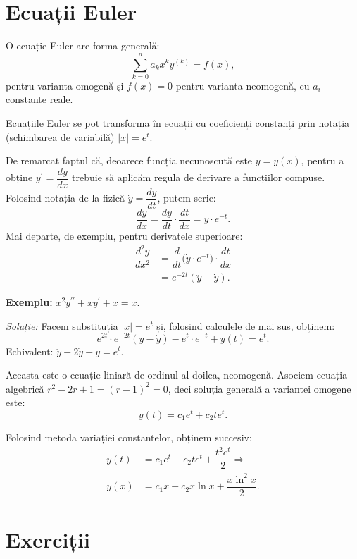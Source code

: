 \section{Ecuații Euler}
O ecuație Euler are forma generală:
\[
  \sum_{k = 0}^n a_k x^k y^{(k)} = f(x),
\]
pentru varianta omogenă și $ f(x) = 0 $ pentru varianta neomogenă, cu $ a_i $
constante reale.

Ecuațiile Euler se pot transforma în ecuații cu coeficienți constanți prin notația
(schimbarea de variabilă) $ |x| = e^t $.

De remarcat faptul că, deoarece funcția necunoscută este $ y = y(x) $, pentru
a obține $ y^{\prime} = \dfrac{dy}{dx} $ trebuie să aplicăm regula de derivare
a funcțiilor compuse. Folosind notația de la fizică $ \dot{y} = \dfrac{dy}{dt} $,
putem scrie:
\[
  \dfrac{dy}{dx} = \dfrac{dy}{dt} \cdot \dfrac{dt}{dx} = \dot{y} \cdot e^{-t}.
\]
Mai departe, de exemplu, pentru derivatele superioare:
\begin{align*}
  \dfrac{d^2 y}{dx^2} &= \dfrac{d}{dt} \Big( \dot{y} \cdot e^{-t} \Big) %
                        \cdot \dfrac{dt}{dx} \\
                      &= e^{-2t} (\ddot{y} - \dot{y}).
\end{align*}

\vspace{1cm}

\textbf{Exemplu:} $ x^2 y^{\prime\prime} + xy^{\prime} + x = x $.

\emph{Soluție:} Facem substituția $ |x| = e^t $ și, folosind calculele
de mai sus, obținem:
\[
  e^{2t} \cdot e^{-2t} (\ddot{y} - \dot{y}) - e^t \cdot e^{-t} + y(t) = e^t.
\]
Echivalent: $ \ddot{y} - 2\dot{y} + y = e^t $.

Aceasta este o ecuație liniară de ordinul al doilea, neomogenă. Asociem ecuația
algebrică $ r^2 - 2r + 1 = (r - 1)^2 = 0 $, deci soluția generală a variantei
omogene este:
\[
  y(t) = c_1 e^t + c_2 te^t.
\]

Folosind metoda variației constantelor, obținem succesiv:
\begin{align*}
  y(t) &= c_1 e^t + c_2 t e^t + \dfrac{t^2 e^t}{2} \Rightarrow \\
  y(x) &= c_1 x + c_2 x \ln x + \dfrac{x \ln^2 x}{2}.
\end{align*}



\section{Exerciții}

